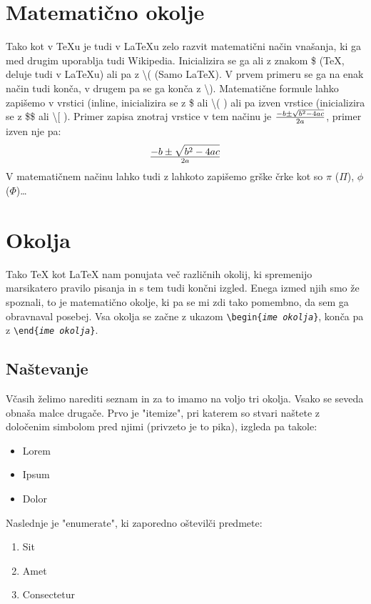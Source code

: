 \documentclass[a4paper]{book}
\newcommand\tbs{\textbackslash{}}
\begin{document}
\section{Matematično okolje}
Tako kot v \TeX{}u je tudi v \LaTeX{}u zelo razvit matematični način vnašanja, ki ga med drugim uporablja tudi Wikipedia. Inicializira se ga ali z znakom \${} (\TeX{}, deluje tudi v \LaTeX{}u) ali pa z \tbs{}( (Samo \LaTeX{}). V prvem primeru se ga na enak način tudi konča, v drugem pa se ga konča z \tbs{}). Matematične formule lahko zapišemo v vrstici (inline, inicializira se z \${} ali \tbs{}( ) ali pa izven vrstice (inicializira se z \${}\${} ali \tbs{}[ ). Primer zapisa znotraj vrstice v tem načinu je \(- b \pm \sqrt{b^2 - 4ac} \over 2a\), primer izven nje pa: \[- b \pm \sqrt{b^2 - 4ac} \over 2a\] V matematičnem načinu lahko tudi z lahkoto zapišemo grške črke kot so $\pi{}$ ($\Pi{}$), $\phi{}$ ($\Phi{}$)\ldots


\section{Okolja}

Tako \TeX{} kot \LaTeX{} nam ponujata več različnih okolij, ki spremenijo marsikatero pravilo pisanja in s tem tudi končni izgled. Enega izmed njih smo že spoznali, to je matematično okolje, ki pa se mi zdi tako pomembno, da sem ga obravnaval posebej. Vsa okolja se začne z ukazom \texttt{\tbs{}begin\{{\em ime okolja}\}}, konča pa z \texttt{\tbs{}end\{{\em ime okolja}\}}.

\subsection{Naštevanje}
Včasih želimo narediti seznam in za to imamo na voljo tri okolja. Vsako se seveda obnaša malce drugače. Prvo je "itemize", pri katerem so stvari naštete z določenim simbolom pred njimi (privzeto je to pika), izgleda pa takole:
\begin{itemize}
\item Lorem
\item Ipsum
\item Dolor
\end{itemize}

Naslednje je "enumerate", ki zaporedno oštevilči predmete:
\begin{enumerate}
\item Sit
\item Amet
\item Consectetur
\end{enumerate}
\end{document}
